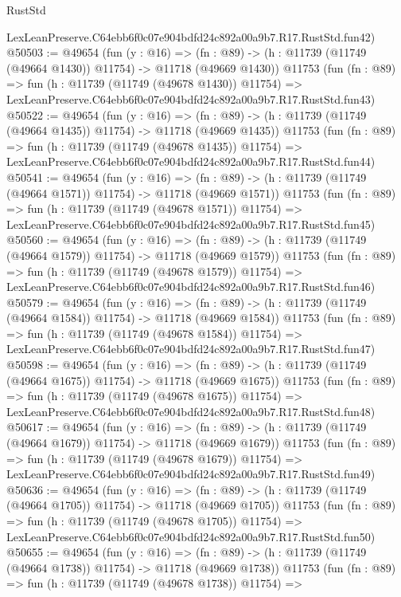 \begin{lexlean}{RustStd}
\begin{coremodule}
    LexLeanPreserve.C64ebb6f0c07e904bdfd24c892a00a9b7.R17.RustStd.fun42)
@50503 := @49654
    (fun (y : @16) =>
    (fn : @89) -> (h : @11739 (@11749 (@49664 @1430)) @11754) -> @11718 (@49669 @1430))
    @11753
    (fun (fn : @89) =>
    fun (h : @11739 (@11749 (@49678 @1430)) @11754) =>
    LexLeanPreserve.C64ebb6f0c07e904bdfd24c892a00a9b7.R17.RustStd.fun43)
@50522 := @49654
    (fun (y : @16) =>
    (fn : @89) -> (h : @11739 (@11749 (@49664 @1435)) @11754) -> @11718 (@49669 @1435))
    @11753
    (fun (fn : @89) =>
    fun (h : @11739 (@11749 (@49678 @1435)) @11754) =>
    LexLeanPreserve.C64ebb6f0c07e904bdfd24c892a00a9b7.R17.RustStd.fun44)
@50541 := @49654
    (fun (y : @16) =>
    (fn : @89) -> (h : @11739 (@11749 (@49664 @1571)) @11754) -> @11718 (@49669 @1571))
    @11753
    (fun (fn : @89) =>
    fun (h : @11739 (@11749 (@49678 @1571)) @11754) =>
    LexLeanPreserve.C64ebb6f0c07e904bdfd24c892a00a9b7.R17.RustStd.fun45)
@50560 := @49654
    (fun (y : @16) =>
    (fn : @89) -> (h : @11739 (@11749 (@49664 @1579)) @11754) -> @11718 (@49669 @1579))
    @11753
    (fun (fn : @89) =>
    fun (h : @11739 (@11749 (@49678 @1579)) @11754) =>
    LexLeanPreserve.C64ebb6f0c07e904bdfd24c892a00a9b7.R17.RustStd.fun46)
@50579 := @49654
    (fun (y : @16) =>
    (fn : @89) -> (h : @11739 (@11749 (@49664 @1584)) @11754) -> @11718 (@49669 @1584))
    @11753
    (fun (fn : @89) =>
    fun (h : @11739 (@11749 (@49678 @1584)) @11754) =>
    LexLeanPreserve.C64ebb6f0c07e904bdfd24c892a00a9b7.R17.RustStd.fun47)
@50598 := @49654
    (fun (y : @16) =>
    (fn : @89) -> (h : @11739 (@11749 (@49664 @1675)) @11754) -> @11718 (@49669 @1675))
    @11753
    (fun (fn : @89) =>
    fun (h : @11739 (@11749 (@49678 @1675)) @11754) =>
    LexLeanPreserve.C64ebb6f0c07e904bdfd24c892a00a9b7.R17.RustStd.fun48)
@50617 := @49654
    (fun (y : @16) =>
    (fn : @89) -> (h : @11739 (@11749 (@49664 @1679)) @11754) -> @11718 (@49669 @1679))
    @11753
    (fun (fn : @89) =>
    fun (h : @11739 (@11749 (@49678 @1679)) @11754) =>
    LexLeanPreserve.C64ebb6f0c07e904bdfd24c892a00a9b7.R17.RustStd.fun49)
@50636 := @49654
    (fun (y : @16) =>
    (fn : @89) -> (h : @11739 (@11749 (@49664 @1705)) @11754) -> @11718 (@49669 @1705))
    @11753
    (fun (fn : @89) =>
    fun (h : @11739 (@11749 (@49678 @1705)) @11754) =>
    LexLeanPreserve.C64ebb6f0c07e904bdfd24c892a00a9b7.R17.RustStd.fun50)
@50655 := @49654
    (fun (y : @16) =>
    (fn : @89) -> (h : @11739 (@11749 (@49664 @1738)) @11754) -> @11718 (@49669 @1738))
    @11753
    (fun (fn : @89) =>
    fun (h : @11739 (@11749 (@49678 @1738)) @11754) =>

\end{coremodule}
\end{lexlean}
